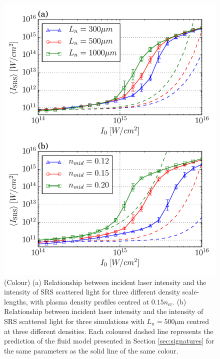 \begin{figure}[!ht]
     \centering
    \includegraphics[width=0.75\columnwidth]{Chapters/C4_iSRS/fig6_6a_6b.pdf}
    \caption{
    (Colour) (a)  Relationship between incident laser intensity and the intensity of SRS scattered light for three different density scale-lengths, with plasma density profiles centred at $0.15n_\mathrm{cr}$.
    (b) Relationship between incident laser intensity and the intensity of SRS scattered light for three simulations with $L_n=500\si{\micro\metre}$ centred at three different densities.
    Each coloured dashed line represents the prediction of the fluid model presented in Section \ref{sec:signatures} for the same parameters as the solid line of the same colour.
    }
    \label{fig:paramScan}
\end{figure}

